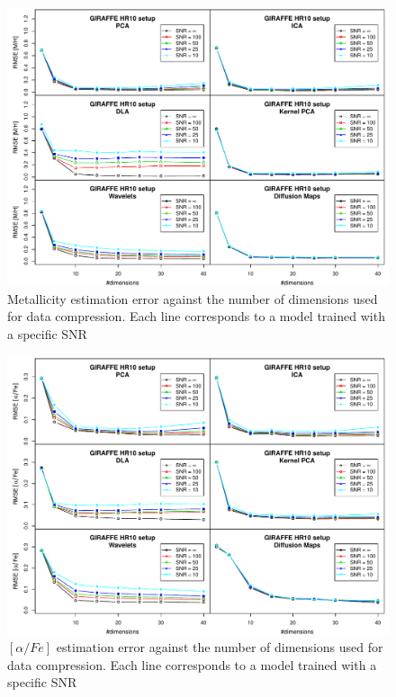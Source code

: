 \documentclass[a4paper,fleqn,usenatbib]{mnras}
\begin{document}
{{{\begin{figure}
\centering\includegraphics[width=\textwidth]{flamesHR10_Meta_log_BestSVM_N-SNR-RMSE_test.pdf}
\caption{Metallicity estimation error against the number of dimensions
  used for data compression. Each line corresponds to a model trained
  with a specific SNR}
\label{fig:methodsnrMeta}
\end{figure}

\begin{figure}
\centering\includegraphics[width=\textwidth]{flamesHR10_AlFe_log_BestSVM_N-SNR-RMSE_test.pdf}
\caption{$\left[ \alpha/Fe \right]$ estimation error against the number of dimensions
  used for data compression. Each line corresponds to a model trained
  with a specific SNR}
\label{fig:methodsnrAlpha}
\end{figure}

}}}
\end{document}
